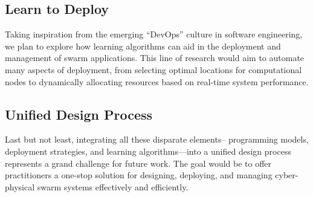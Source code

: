 \subsection*{Learn to Deploy}
Taking inspiration from the emerging ``DevOps'' culture in software engineering, 
 we plan to explore how learning algorithms can aid in the deployment and management of swarm applications. 
 This line of research would aim to automate many aspects of deployment, 
 from selecting optimal locations for computational nodes to dynamically allocating resources based on real-time system performance.

\subsection*{Unified Design Process}
Last but not least, 
 integrating all these disparate elements--
 programming models, deployment strategies, and learning algorithms---into a unified design process represents a grand challenge for future work. 
 The goal would be to offer practitioners a one-stop solution for designing, deploying, and managing cyber-physical swarm systems effectively and efficiently.